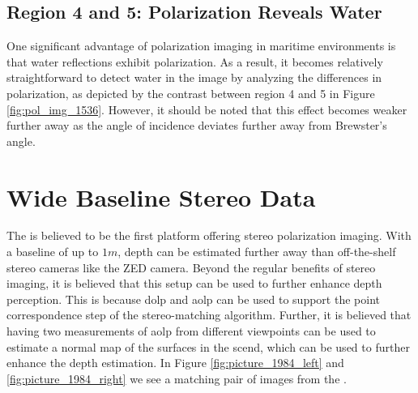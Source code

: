 \subsection{Region 4 and 5: Polarization Reveals Water}
One significant advantage of polarization imaging in maritime environments is that water reflections exhibit polarization.
As a result, it becomes relatively straightforward to detect water in the image by analyzing the differences in polarization, as depicted by the contrast between region 4 and 5 in Figure \ref{fig:pol_img_1536}.
However, it should be noted that this effect becomes weaker further away as the angle of incidence deviates further away from Brewster's angle.


\section{Wide Baseline Stereo Data}
The \sr is believed to be the first platform offering stereo polarization imaging.
With a baseline of up to $1m$, depth can be estimated further away than off-the-shelf stereo cameras like the ZED camera.
Beyond the regular benefits of stereo imaging, it is believed that this setup can be used to further enhance depth perception.
This is because \gls{dolp} and \gls{aolp} can be used to support the point correspondence step of the stereo-matching algorithm.
Further, it is believed that having two measurements of \gls{aolp} from different viewpoints can be used to estimate a normal map of the surfaces in the scend, which can be used to further enhance the depth estimation.
In Figure \ref{fig:picture_1984_left} and \ref{fig:picture_1984_right} we see a matching pair of images from the \sr.
